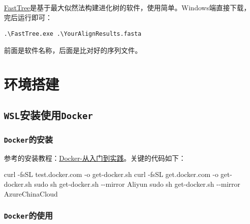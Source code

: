 \documentclass[
  10pt,
]{book}
\newenvironment{Shaded}{\begin{snugshade}}{\end{snugshade}}
\newcommand{\NormalTok}[1]{#1}
\newcommand{\SpecialCharTok}[1]{\textcolor[rgb]{0.00,0.00,0.00}{#1}}
\begin{document}
\href{http://www.microbesonline.org/fasttree/}{FastTree}是基于最大似然法构建进化树的软件，使用简单。Windows端直接下载，完后运行即可：

\begin{verbatim}
.\FastTree.exe .\YourAlignResults.fasta
\end{verbatim}

前面是软件名称，后面是比对好的序列文件。

\hypertarget{bio-env}{%
\chapter{环境搭建}\label{bio-env}}

\hypertarget{WSL4Docker}{%
\section{\texorpdfstring{\texttt{WSL}安装使用\texttt{Docker}}{WSL安装使用Docker}}\label{WSL4Docker}}

\hypertarget{dockerux7684ux5b89ux88c5}{%
\subsection{\texorpdfstring{\texttt{Docker}的安装}{Docker的安装}}\label{dockerux7684ux5b89ux88c5}}

参考的安装教程：\href{https://yeasy.gitbook.io/docker_practice/install/ubuntu}{Docker-从入门到实践}。关键的代码如下：

\begin{Shaded}
\begin{Highlighting}[]
\NormalTok{curl }\SpecialCharTok{{-}}\NormalTok{fsSL test.docker.com }\SpecialCharTok{{-}}\NormalTok{o get}\SpecialCharTok{{-}}\NormalTok{docker.sh}
\NormalTok{curl }\SpecialCharTok{{-}}\NormalTok{fsSL get.docker.com }\SpecialCharTok{{-}}\NormalTok{o get}\SpecialCharTok{{-}}\NormalTok{docker.sh}
\NormalTok{sudo sh get}\SpecialCharTok{{-}}\NormalTok{docker.sh }\SpecialCharTok{{-}{-}}\NormalTok{mirror Aliyun}
\NormalTok{sudo sh get}\SpecialCharTok{{-}}\NormalTok{docker.sh }\SpecialCharTok{{-}{-}}\NormalTok{mirror AzureChinaCloud}
\end{Highlighting}
\end{Shaded}

\hypertarget{dockerux7684ux4f7fux7528}{%
\subsection{\texorpdfstring{\texttt{Docker}的使用}{Docker的使用}}\label{dockerux7684ux4f7fux7528}}
\end{document}
